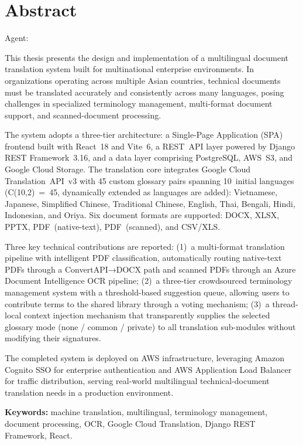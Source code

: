 \chapter*{Abstract}

Agent:

This thesis presents the design and implementation of a multilingual document translation system
built for multinational enterprise environments. In organizations operating across multiple Asian
countries, technical documents must be translated accurately and consistently across many
languages, posing challenges in specialized terminology management, multi-format document
support, and scanned-document processing.

The system adopts a three-tier architecture: a Single-Page Application (SPA) frontend built with
React~18 and Vite~6, a REST~API layer powered by Django REST Framework~3.16, and a data layer
comprising PostgreSQL, AWS~S3, and Google Cloud Storage. The translation core integrates
Google Cloud Translation~API~v3 with 45 custom glossary pairs spanning 10~initial languages
(C(10,2)~=~45, dynamically extended as languages are added): Vietnamese, Japanese, Simplified
Chinese, Traditional Chinese, English, Thai, Bengali, Hindi, Indonesian, and Oriya.
Six document formats are supported: DOCX, XLSX, PPTX, PDF~(native-text), PDF~(scanned),
and CSV/XLS.

Three key technical contributions are reported: (1)~a multi-format translation pipeline with
intelligent PDF classification, automatically routing native-text PDFs through a
ConvertAPI→DOCX path and scanned PDFs through an Azure Document Intelligence OCR pipeline;
(2)~a three-tier crowdsourced terminology management system with a threshold-based suggestion
queue, allowing users to contribute terms to the shared library through a voting mechanism;
(3)~a thread-local context injection mechanism that transparently supplies the selected glossary
mode (none / common / private) to all translation sub-modules without modifying their signatures.

The completed system is deployed on AWS infrastructure, leveraging Amazon Cognito SSO for
enterprise authentication and AWS Application Load Balancer for traffic distribution, serving
real-world multilingual technical-document translation needs in a production environment.

\bigskip
\noindent\textbf{Keywords:} machine translation, multilingual, terminology management, document
processing, OCR, Google Cloud Translation, Django REST Framework, React.
